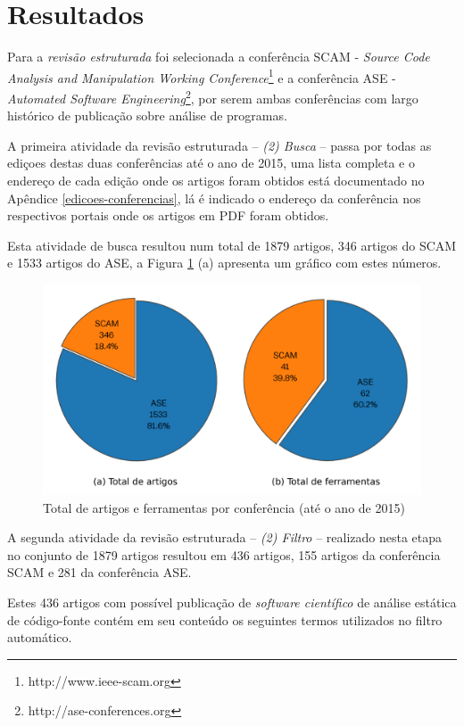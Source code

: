 \section{Resultados}

Para a {\it revisão estruturada} foi selecionada a conferência SCAM - {\it
Source Code Analysis and Manipulation Working
Conference}\footnote{http://www.ieee-scam.org} e a conferência ASE - {\it
Automated Software Engineering}\footnote{http://ase-conferences.org}, por serem
ambas conferências com largo histórico de publicação sobre análise de
programas.

A primeira atividade da revisão estruturada -- {\it (2) Busca} -- passa por todas as ediçoes
destas duas conferências até o ano de 2015, uma lista completa e o endereço de
cada edição onde os artigos foram obtidos está documentado no Apêndice
\ref{edicoes-conferencias}, lá é indicado o endereço da conferência nos
respectivos portais onde os artigos em PDF foram obtidos.

Esta atividade de busca resultou num total de 1879 artigos, 346 artigos do SCAM
e 1533 artigos do ASE, a Figura \ref{grafico-total-artigos} (a) apresenta um
gráfico com estes números.

\begin{figure}[H]
  \center
  \includegraphics[scale=0.9]{imagens/total-artigos-e-ferramentas.png}
  \caption{Total de artigos e ferramentas por conferência (até o ano de 2015)}
  \label{grafico-total-artigos}
\end{figure}

A segunda atividade da revisão estruturada -- {\it (2) Filtro} -- realizado nesta
etapa no conjunto de 1879 artigos resultou em 436 artigos,
155 artigos da conferência SCAM e 281 da conferência ASE.

Estes 436 artigos com possível publicação de {\it software científico} de
análise estática de código-fonte contém em seu conteúdo os seguintes termos
utilizados no filtro automático.

